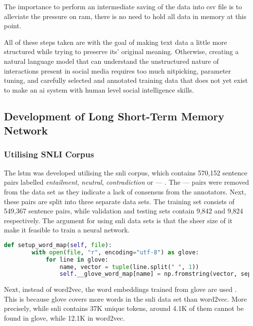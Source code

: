             The importance to perform an intermediate saving of the data into \gls{csv} file is to alleviate the pressure on \gls{ram}, there is no need to hold all data in memory at this point.
            
            All of these steps taken are with the goal of making text data a little more structured while trying to preserve its' original meaning. Otherwise, creating a natural language model that can understand the unstructured nature of interactions present in social media requires too much nitpicking, parameter tuning, and carefully selected and annotated training data that does not yet exist to make an \gls{ai} system with human level social intelligence skills.
        
    \subsection{Development of Long Short-Term Memory Network} \label{devlstm}
        \subsubsection{Utilising SNLI Corpus}
            The \gls{lstm} was developed utilising the \gls{snli} corpus, which contains 570,152 sentence pairs labelled \textit{entailment}, \textit{neutral}, \textit{contradiction} or --- \autocite{Bowman2015ALA}. The --- pairs were removed from the data set as they indicate a lack of consensus from the annotators. Next, these pairs are split into three separate data sets. The training set consists of 549,367 sentence pairs, while validation and testing sets contain 9,842 and 9,824 respectively. The argument for using \gls{snli} data sets is that the sheer size of it make it feasible to train a neural network.
            
            \begin{lstlisting}[language=Python, caption=Setup of GloVe Data, label=code:glovemap]
    def setup_word_map(self, file):
        with open(file, "r", encoding="utf-8") as glove:
            for line in glove:
                name, vector = tuple(line.split(" ", 1))
                self.__glove_word_map[name] = np.fromstring(vector, sep=" ")
            \end{lstlisting}
            \FloatBarrier
        
            Next, instead of word2vec, the word embeddings trained from \gls{glove} are used \autocite{Pennington2014GloveGV}. This is because \gls{glove} covers more words in the \gls{snli} data set than word2vec. More precisely, while \gls{snli} contains 37K unique tokens, around 4.1K of them cannot be found in \gls{glove}, while 12.1K in word2vec.
            
